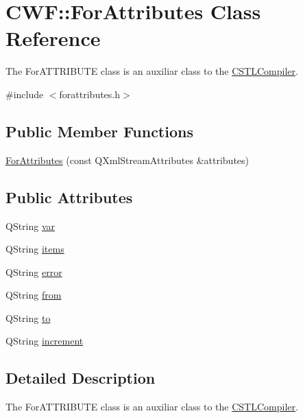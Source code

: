 \hypertarget{class_c_w_f_1_1_for_attributes}{\section{C\+W\+F\+:\+:For\+Attributes Class Reference}
\label{class_c_w_f_1_1_for_attributes}
}


The For\+A\+T\+T\+R\+I\+B\+U\+T\+E class is an auxiliar class to the \hyperlink{class_c_w_f_1_1_c_s_t_l_compiler}{C\+S\+T\+L\+Compiler}.  




{\ttfamily \#include $<$forattributes.\+h$>$}

\subsection*{Public Member Functions}
\begin{DoxyCompactItemize}
\item 
\hyperlink{class_c_w_f_1_1_for_attributes_a8b2245bb0b5b8b16de346ac8402678a0}{For\+Attributes} (const Q\+Xml\+Stream\+Attributes \&attributes)
\end{DoxyCompactItemize}
\subsection*{Public Attributes}
\begin{DoxyCompactItemize}
\item 
Q\+String \hyperlink{class_c_w_f_1_1_for_attributes_a531689e9e92369507be81971caf347a6}{var}
\item 
Q\+String \hyperlink{class_c_w_f_1_1_for_attributes_aa16fb4090c8e95ec98f8f9a1ff768dd3}{items}
\item 
Q\+String \hyperlink{class_c_w_f_1_1_for_attributes_ac27ba2f6562de074fb345d577f171ad6}{error}
\item 
Q\+String \hyperlink{class_c_w_f_1_1_for_attributes_acb6db58dc865974f20f1b9a291f7a94b}{from}
\item 
Q\+String \hyperlink{class_c_w_f_1_1_for_attributes_a33cef70ab52e64d4157ad75c8bfe604a}{to}
\item 
Q\+String \hyperlink{class_c_w_f_1_1_for_attributes_a316811830dab52e5f38eb8a5f43f1164}{increment}
\end{DoxyCompactItemize}


\subsection{Detailed Description}
The For\+A\+T\+T\+R\+I\+B\+U\+T\+E class is an auxiliar class to the \hyperlink{class_c_w_f_1_1_c_s_t_l_compiler}{C\+S\+T\+L\+Compiler}. 


